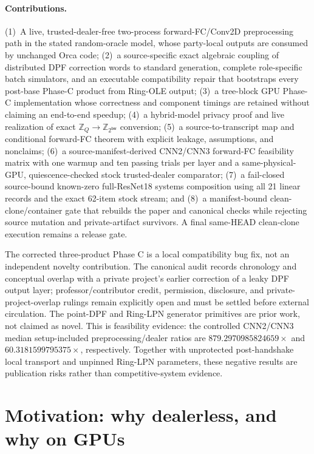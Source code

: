\documentclass[11pt]{article}
\newcommand{\Z}{\mathbb{Z}}
\newcommand{\bw}{\mathsf{bw}}
\begin{document}
\paragraph{Contributions.}
(1)~A live, trusted-dealer-free two-process forward-FC/Conv2D preprocessing
path in the stated random-oracle model, whose party-local outputs are consumed
by unchanged Orca code;
(2)~a source-specific exact algebraic coupling of distributed DPF correction
words to standard generation, complete role-specific batch simulators, and an
executable compatibility repair that bootstraps every post-base Phase-C product
from Ring-OLE output;
(3)~a tree-block GPU Phase-C implementation whose correctness and component
timings are retained without claiming an end-to-end speedup;
(4)~a hybrid-model privacy proof and live realization of exact
$\Z_Q\to\Z_{2^\bw}$ conversion;
(5)~a source-to-transcript map and conditional forward-FC theorem with explicit
leakage, assumptions, and nonclaims;
(6)~a source-manifest-derived CNN2/CNN3 forward-FC feasibility matrix with one
warmup and ten passing trials per layer and a same-physical-GPU,
quiescence-checked stock trusted-dealer comparator;
(7)~a fail-closed source-bound known-zero full-ResNet18 systems composition
using all 21 linear records and the exact 62-item stock stream; and
(8)~a manifest-bound clean-clone/container gate that rebuilds the paper and
canonical checks while rejecting source mutation and private-artifact
survivors. A final same-HEAD clean-clone execution remains a release gate.

The corrected three-product Phase C is a local compatibility bug fix, not an
independent novelty contribution. The canonical audit records chronology and
conceptual overlap with a private project's earlier correction of a leaky DPF
output layer; professor/contributor credit, permission, disclosure, and
private-project-overlap rulings remain explicitly open and must be settled
before external circulation. The point-DPF and Ring-LPN generator primitives
are prior work, not claimed as novel. This is feasibility evidence: the
controlled CNN2/CNN3 median setup-included preprocessing/dealer ratios are
$879.2970985824659\times$ and $60.3181599795375\times$, respectively.
Together with unprotected post-handshake local transport and unpinned Ring-LPN
parameters, these negative results are publication risks rather than
competitive-system evidence.
\section{Motivation: why dealerless, and why on GPUs}
\label{sec:motivation}
\end{document}
